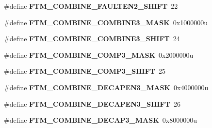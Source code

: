 \begin{DoxyCompactItemize}
\item 
\#define {\bfseries F\+T\+M\+\_\+\+C\+O\+M\+B\+I\+N\+E\+\_\+\+F\+A\+U\+L\+T\+E\+N2\+\_\+\+S\+H\+I\+FT}~22\hypertarget{group__FTM__Register__Masks_ga35ee8ad9a6f4e07fa058735b7807e0a8}{}\label{group__FTM__Register__Masks_ga35ee8ad9a6f4e07fa058735b7807e0a8}

\item 
\#define {\bfseries F\+T\+M\+\_\+\+C\+O\+M\+B\+I\+N\+E\+\_\+\+C\+O\+M\+B\+I\+N\+E3\+\_\+\+M\+A\+SK}~0x1000000u\hypertarget{group__FTM__Register__Masks_gac97253f34364aee2a49e2ad8c470f46c}{}\label{group__FTM__Register__Masks_gac97253f34364aee2a49e2ad8c470f46c}

\item 
\#define {\bfseries F\+T\+M\+\_\+\+C\+O\+M\+B\+I\+N\+E\+\_\+\+C\+O\+M\+B\+I\+N\+E3\+\_\+\+S\+H\+I\+FT}~24\hypertarget{group__FTM__Register__Masks_gac4d1e467f5f7a75c3c0f9f84819580e2}{}\label{group__FTM__Register__Masks_gac4d1e467f5f7a75c3c0f9f84819580e2}

\item 
\#define {\bfseries F\+T\+M\+\_\+\+C\+O\+M\+B\+I\+N\+E\+\_\+\+C\+O\+M\+P3\+\_\+\+M\+A\+SK}~0x2000000u\hypertarget{group__FTM__Register__Masks_gac7ae22ebae3b9dafb28376801cac4f9d}{}\label{group__FTM__Register__Masks_gac7ae22ebae3b9dafb28376801cac4f9d}

\item 
\#define {\bfseries F\+T\+M\+\_\+\+C\+O\+M\+B\+I\+N\+E\+\_\+\+C\+O\+M\+P3\+\_\+\+S\+H\+I\+FT}~25\hypertarget{group__FTM__Register__Masks_ga7ed13b0798dd080009e0e0843bab210f}{}\label{group__FTM__Register__Masks_ga7ed13b0798dd080009e0e0843bab210f}

\item 
\#define {\bfseries F\+T\+M\+\_\+\+C\+O\+M\+B\+I\+N\+E\+\_\+\+D\+E\+C\+A\+P\+E\+N3\+\_\+\+M\+A\+SK}~0x4000000u\hypertarget{group__FTM__Register__Masks_ga86ff21306cbdb626b711080b76d0366e}{}\label{group__FTM__Register__Masks_ga86ff21306cbdb626b711080b76d0366e}

\item 
\#define {\bfseries F\+T\+M\+\_\+\+C\+O\+M\+B\+I\+N\+E\+\_\+\+D\+E\+C\+A\+P\+E\+N3\+\_\+\+S\+H\+I\+FT}~26\hypertarget{group__FTM__Register__Masks_ga4e05420ade8e9776e65f1b2f054465a5}{}\label{group__FTM__Register__Masks_ga4e05420ade8e9776e65f1b2f054465a5}

\item 
\#define {\bfseries F\+T\+M\+\_\+\+C\+O\+M\+B\+I\+N\+E\+\_\+\+D\+E\+C\+A\+P3\+\_\+\+M\+A\+SK}~0x8000000u\hypertarget{group__FTM__Register__Masks_ga9eed3afcff66166330a8ec14590a1808}{}\label{group__FTM__Register__Masks_ga9eed3afcff66166330a8ec14590a1808}


\end{DoxyCompactItemize}
